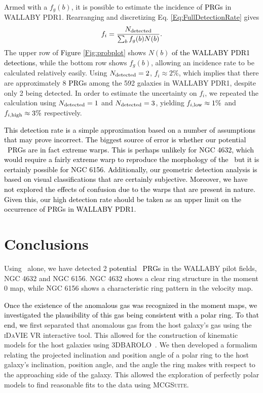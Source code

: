 \documentclass[fleqn,usenatbib]{mnras}
\newcommand{\hi}{\text{H\,\sc{i}}}
\newcommand{\barolo}{\textsc{3DBAROLO}~}
\begin{document}
Armed with a $f_{g}(b)$, it is possible to estimate the incidence of \textcolor{black}{PRGs} in WALLABY PDR1.  Rearranging and discretizing Eq. \ref{Eq:FullDetectionRate} gives
\begin{equation}\label{Eq:FullIncidenceRate}
    f_{i}=\frac{ N_{\rm{detected}} } {\sum_{b} f_{g}(b) N(b)}.
\end{equation}
The upper row of \textcolor{black}{Figure \ref{Fig:probplot}} shows $N(b)$ \textcolor{black}{of the WALLABY PDR1 detections}, while the bottom row shows $f_{g}(b)$, allowing an incidence rate to be calculated relatively easily.  Using $N_{\rm{detected}}=2$, $f_{i}\approx 2 \%$, which implies that there are approximately 8 \textcolor{black}{PRGs} among the 592 galaxies in WALLABY PDR1, despite only 2 being detected.  In order to estimate the uncertainty on $f_{i}$, we repeated the calculation using $N_{\rm{detected}}=1$ and $N_{\rm{detected}}=3$, yielding $f_{i,\rm{low}}\approx 1\%$ and $f_{i,\rm{high}}\approx 3\%$ respectively.  

\textcolor{black}{This detection rate is a simple approximation based on a number of assumptions that may prove incorrect.  The biggest source of error is whether our \textcolor{black}{potential \hi\ PRGs} are in fact extreme warps.  This is perhaps unlikely for NGC 4632, which would require a fairly extreme warp to reproduce the morphology of the \hi\, but it is certainly possible for NGC 6156.  Additionally, our geometric detection analysis is based on visual classifications that are certainly subjective.  Moreover, we have not explored the effects of confusion due to the warps that are present in nature.  Given this, our high detection rate should be taken as an upper limit on the occurrence of PRGs in WALLABY PDR1.}


\section{Conclusions}\label{Sec:Conclusions}

Using \hi\ alone, we have detected 2 \textcolor{black}{potential \hi\ PRGs} in the WALLABY pilot fields, NGC 4632 and NGC 6156.  NGC 4632 shows a clear ring structure in the moment 0 map, while NGC 6156 shows a characteristic ring pattern in the velocity map.  

\textcolor{black}{Once the existence of the anomalous gas was recognized in the moment maps, we investigated the plausibility of this gas being consistent with a polar ring. To that end, we} first separated that anomalous gas from the host galaxy's gas using the \textsc{iDaVIE} VR interactive tool.  This allowed for the construction of kinematic models for the host galaxies using \barolo.  We then developed a formalism relating the projected inclination and position angle of a polar ring to the host galaxy's inclination, position angle, and the angle the ring makes with respect to the approaching side of the galaxy.  This allowed the exploration of perfectly polar models to find reasonable fits to the data using \textsc{MCGSuite}.
\end{document}

